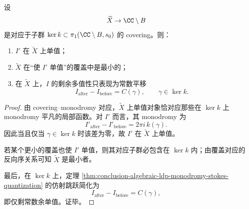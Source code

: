 \begin{corollary}\label{cor:conclusion-algebraic-ldp-minimal-covering-kernel-k}
设
\[
\widetilde X\to \CC\setminus B
\]
是对应于子群 \(\ker k\subset \pi_1(\CC\setminus B,s_0)\) 的 covering。则：
\begin{enumerate}
  \item \(I'\) 在 \(\widetilde X\) 上单值；
  \item \(\widetilde X\) 在“使 \(I'\) 单值”的覆盖中是最小的；
  \item 在 \(\widetilde X\) 上，\(I\) 的剩余多值性只表现为常数平移
  \[
  I_{\mathrm{after}}-I_{\mathrm{before}}=C(\gamma),
  \qquad
  \gamma\in \ker k.
  \]
\end{enumerate}
\end{corollary}
\begin{proof}
由 covering--monodromy 对应，\(\widetilde X\) 上单值对象恰对应那些在 \(\ker k\) 上 monodromy 平凡的局部函数。对 \(I'\) 而言，其 monodromy 为
\[
I'_{\mathrm{after}}-I'_{\mathrm{before}}=2\pi i\,k(\gamma).
\]
因此当且仅当 \(\gamma\in \ker k\) 时该差为零，故 \(I'\) 在 \(\widetilde X\) 上单值。

若某个更小的覆盖也使 \(I'\) 单值，则其对应子群必包含在 \(\ker k\) 内；由覆盖对应的反向序关系可知 \(\widetilde X\) 是最小者。

最后，在 \(\ker k\) 上，定理 \ref{thm:conclusion-algebraic-ldp-monodromy-stokes-quantization} 的仿射跳跃简化为
\[
I_{\mathrm{after}}-I_{\mathrm{before}}=C(\gamma),
\]
即仅剩常数余单值。证毕。
\end{proof}
